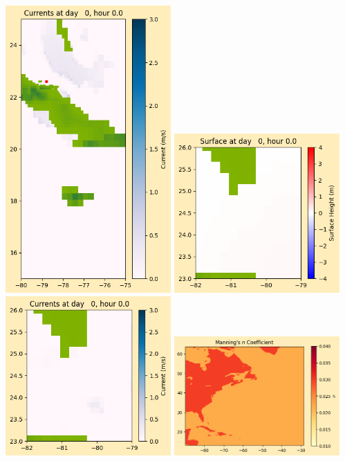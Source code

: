 \documentclass[11pt]{article}
\begin{document}
\includegraphics[width=0.475\textwidth]{frame0012fig1008.png}
\vskip 10pt 
\includegraphics[width=0.475\textwidth]{frame0012fig1009.png}
\includegraphics[width=0.475\textwidth]{frame0012fig1010.png}
\vskip 10pt 
\includegraphics[width=0.475\textwidth]{frame0012fig1011.png}
\end{document}
